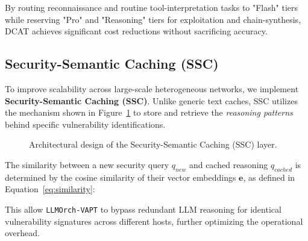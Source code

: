 By routing reconnaissance and routine tool-interpretation tasks to "Flash" tiers while reserving "Pro" and "Reasoning" tiers for exploitation and chain-synthesis, DCAT achieves significant cost reductions without sacrificing accuracy.

\subsection{Security-Semantic Caching (SSC)}
\label{sec:ssc}
To improve scalability across large-scale heterogeneous networks, we implement \textbf{Security-Semantic Caching (SSC)}. Unlike generic text caches, SSC utilizes the mechanism shown in Figure~\ref{fig:ssc_mechanism} to store and retrieve the \textit{reasoning patterns} behind specific vulnerability identifications.

\begin{figure}[!t]
    \centering
    \resizebox{\columnwidth}{!}{
        
    }
    \caption{Architectural design of the Security-Semantic Caching (SSC) layer.}
    \label{fig:ssc_mechanism}
\end{figure}

The similarity between a new security query $q_{new}$ and cached reasoning $q_{cached}$ is determined by the cosine similarity of their vector embeddings $\mathbf{e}$, as defined in Equation~\ref{eq:similarity}:


This allow \texttt{LLMOrch-VAPT} to bypass redundant LLM reasoning for identical vulnerability signatures across different hosts, further optimizing the operational overhead.
